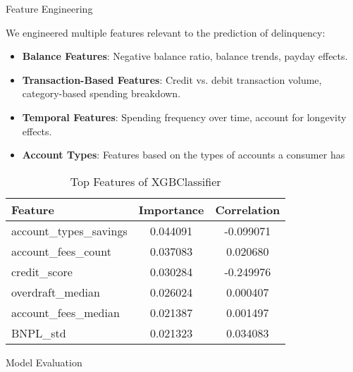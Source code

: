 \documentclass[final]{beamer}
\newlength{\colwidth}
\begin{document}
\begin{frame}[t]
\begin{columns}[t]
\begin{column}{\colwidth}
  \begin{block}{Feature Engineering}

    We engineered multiple features relevant to the prediction of delinquency:
    \begin{itemize}
        \item \textbf{Balance Features}: Negative balance ratio, balance trends, payday effects.
        \item \textbf{Transaction-Based Features}: Credit vs. debit transaction volume, category-based spending breakdown.
        \item \textbf{Temporal Features}: Spending frequency over time, account for longevity effects.
        \item \textbf{Account Types}: Features based on the types of accounts a consumer has
    \end{itemize}

    \begin{table}[H]
        \centering
        \begin{tabular}{|l|c|c|}
            \hline
            Feature & Importance & Correlation \\
            \hline
            account\_types\_savings & 0.044091 & -0.099071 \\
            account\_fees\_count & 0.037083 & 0.020680 \\
            credit\_score & 0.030284 & -0.249976 \\
            overdraft\_median & 0.026024 & 0.000407 \\
            account\_fees\_median & 0.021387 & 0.001497 \\
            BNPL\_std & 0.021323 & 0.034083 \\
            \hline
        \end{tabular}
        \caption{Top Features of XGBClassifier}
        \label{tab:top_features_xgb}
    \end{table}

  \end{block}

  \begin{block}{Model Evaluation}


\end{block}
\end{column}
\end{columns}
\end{frame}
\end{document}
